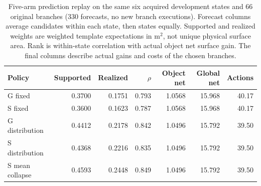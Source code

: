 \begin{table}[H]
\centering\small
\setlength{\tabcolsep}{4pt}
\caption{Five-arm prediction replay on the same six acquired development states and 66 original branches (330 forecasts, no new branch executions). Forecast columns average candidates within each state, then states equally. Supported and realized weights are weighted template expectations in m$^2$, not unique physical surface area. Rank is within-state correlation with actual object net surface gain. The final columns describe actual gains and costs of the chosen branches.}
\label{tab:joint-depth-replay}
\begin{tabular}{lrrrrrr}
\toprule
Policy & Supported & Realized & $\rho$ & Object net & Global net & Actions \\
\midrule
G fixed & 0.3700 & 0.1751 & 0.793 & 1.0568 & 15.968 & 40.17 \\
S fixed & 0.3600 & 0.1623 & 0.787 & 1.0568 & 15.968 & 40.17 \\
G distribution & 0.4412 & 0.2178 & 0.842 & 1.0496 & 15.792 & 39.50 \\
S distribution & 0.4368 & 0.2216 & 0.835 & 1.0496 & 15.792 & 39.50 \\
S mean collapse & 0.4593 & 0.2448 & 0.849 & 1.0496 & 15.792 & 39.50 \\
\bottomrule
\end{tabular}
\end{table}
